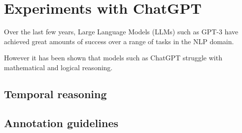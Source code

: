 \section{Experiments with ChatGPT}
Over the last few years, Large Language Models (LLMs) such as GPT-3 \citep{gpt3} have achieved great amounts of success over a range of tasks in the NLP domain.

However it has been shown that models such as ChatGPT struggle with mathematical and logical reasoning. 

\subsection{Temporal reasoning}


\subsection{Annotation guidelines}

\label{App:annguide}
